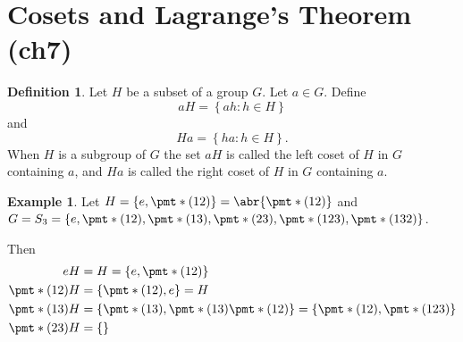 \documentclass[11pt]{article}
\newcommand{\cbr}[1]{\left\{#1\right\}}
\theoremstyle{remark}
\theoremstyle{definition}
\newtheorem{definition}{Definition}[section]
\theoremstyle{remark}
\theoremstyle{definition}
\newtheorem*{example}{Example}
\theoremstyle{remark}
\begin{document}
\section{Cosets and Lagrange's Theorem (ch7)}

\begin{definition}
  Let $H$ be a subset of a group $G$. Let $a\in G$. Define $$aH = \cbr{ah : h\in H}$$ and $$Ha = \cbr{ha : h\in H}.$$ When $H$ is a subgroup of $G$ the set $aH$ is called the left coset of $H$ in $G$ containing $a$, and $Ha$ is called the right coset of $H$ in $G$ containing $a$.
\end{definition}

\begin{example}
  Let $H = \cbr{e,\pmt*{(12)}} = \abr{\pmt*{(12)}}$ and $G = S_3 = \cbr{e,\pmt*{(12)}, \pmt*{(13)}, \pmt*{(23)}, \pmt*{(123)}, \pmt*{(132)} }$.

  Then \begin{align*}
    eH &= H = \cbr{e,\pmt*{(12)}}\\
    \pmt*{(12)}H &= \cbr{\pmt*{(12)},e} = H\\ 
    \pmt*{(13)}H &= \cbr{\pmt*{(13)}, \pmt*{(13)}\pmt*{(12)}} = \cbr{\pmt*{(12)}, \pmt*{(123)}} \\
    \pmt*{(23)}H &= \cbr{}
  \end{align*}
\end{example}
\end{document}
